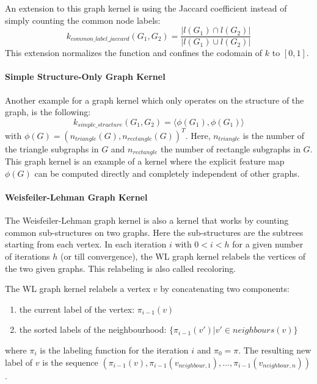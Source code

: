 An extension to this graph kernel is using the Jaccard coefficient instead of simply counting the common node labels:
\begin{equation*}
k_{common\_label\_jaccard}(G_1, G_2) = \frac{| l(G_1) \cap l(G_2) |}{| l(G_1) \cup l(G_2) |}
\end{equation*}
This extension normalizes the function and confines the codomain of $k$ to $[0, 1]$.

\paragraph{Simple Structure-Only Graph Kernel}
Another example for a graph kernel which only operates on the structure of the graph, is the following:
\begin{equation*}
k_{simple\_structure}(G_1, G_2) = \langle \phi(G_1), \phi(G_1) \rangle
\end{equation*}
with $\phi(G) = (n_{triangle}(G), n_{rectangle}(G))^T$. Here, $n_{triangle}$ is the number of the triangle subgraphs in $G$ and $n_{rectangle}$ the number of rectangle subgraphs in $G$.
This graph kernel is an example of a kernel where the explicit feature map $\phi(G)$ can be computed directly and completely independent of other graphs.


\paragraph{Weisfeiler-Lehman Graph Kernel}
The Weisfeiler-Lehman graph kernel is also a kernel that works by counting common sub-structures on two graphs.
Here the sub-structures are the subtrees starting from each vertex.
In each iteration $i$ with $0 < i < h$ for a given number of iterations $h$ (or till convergence), the WL graph kernel relabels the vertices of the two given graphs. This relabeling is also called recoloring.

The WL graph kernel relabels a vertex $v$ by concatenating two components:
\begin{enumerate}
    \item{the current label of the vertex: $\pi_{i-1}(v)$}
    \item{the sorted labels of the neighbourhood: $\{ \pi_{i-1}(v') | v' \in neighbours(v) \}$}
\end{enumerate}
where $\pi_{i}$ is the labeling function for the iteration $i$ and $\pi_0 = \pi$.
The resulting new label of $v$ is the sequence $(\pi_{i-1}(v), \pi_{i-1}(v_{neighbour,1}), \dots , \pi_{i-1}(v_{neighbour,n}))$.

